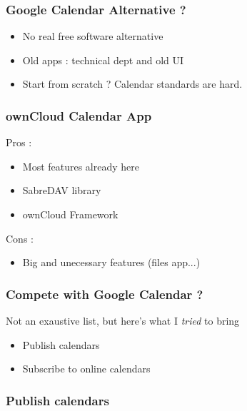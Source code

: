 \documentclass[11pt]{beamer}
\begin{document}
	\begin{frame}
		\frametitle{Google Calendar Alternative ?}
		\begin{itemize}
			\item No real free software alternative
			\item Old apps : technical dept and old UI
			\item Start from scratch ? Calendar standards are hard.
			\end{itemize}
	\end{frame}
	\begin{frame}
		\frametitle{ownCloud Calendar App}
		Pros :
		\begin{itemize}
			\item Most features already here
			\item SabreDAV library
			\item ownCloud Framework
		\end{itemize}
		Cons :
		\begin{itemize}
			\item Big and unecessary features (files app...)
		\end{itemize}
	\end{frame}
	\begin{frame}
		\frametitle{Compete with Google Calendar ?}
		Not an exaustive list, but here's what I \textit{tried} to bring
		\begin{itemize}
			\item Publish calendars
			\item Subscribe to online calendars
		\end{itemize}
	\end{frame}
	\begin{frame}
		\frametitle{Publish calendars}
	\end{frame}
\end{document}
